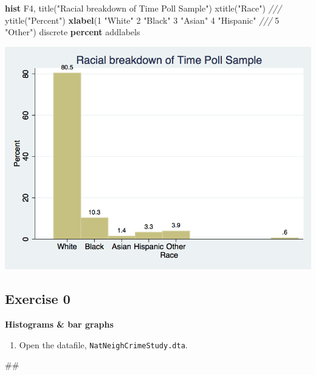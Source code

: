 \documentclass[
]{book}
\newenvironment{Shaded}{\begin{snugshade}}{\end{snugshade}}
\newcommand{\BaseNTok}[1]{\textcolor[rgb]{0.00,0.00,0.81}{#1}}
\newcommand{\CommentTok}[1]{\textcolor[rgb]{0.56,0.35,0.01}{\textit{#1}}}
\newcommand{\KeywordTok}[1]{\textcolor[rgb]{0.13,0.29,0.53}{\textbf{#1}}}
\newcommand{\NormalTok}[1]{#1}
\newcommand{\StringTok}[1]{\textcolor[rgb]{0.31,0.60,0.02}{#1}}
\providecommand{\tightlist}{%
  \setlength{\itemsep}{0pt}\setlength{\parskip}{0pt}}
\begin{document}
\begin{Shaded}
\begin{Highlighting}[]
\KeywordTok{hist}\NormalTok{ F4, }\BaseNTok{title}\NormalTok{(}\StringTok{"Racial breakdown of Time Poll Sample"}\NormalTok{) }\BaseNTok{xtitle}\NormalTok{(}\StringTok{"Race"}\NormalTok{) }\CommentTok{///}
   \BaseNTok{ytitle}\NormalTok{(}\StringTok{"Percent"}\NormalTok{) }\KeywordTok{xlabel}\NormalTok{(1 }\StringTok{"White"}\NormalTok{ 2 }\StringTok{"Black"}\NormalTok{ 3 }\StringTok{"Asian"}\NormalTok{ 4 }\StringTok{"Hispanic"} \CommentTok{///}
\NormalTok{   5 }\StringTok{"Other"}\NormalTok{) discrete }\KeywordTok{percent} \BaseNTok{addlabels}
\end{Highlighting}
\end{Shaded}

\includegraphics{Stata/StataGraphics/images/bargraph.png}

\hypertarget{exercise-0-8}{%
\subsection{Exercise 0}\label{exercise-0-8}}

\textbf{Histograms \& bar graphs}

\begin{enumerate}
\def\labelenumi{\arabic{enumi}.}
\tightlist
\item
  Open the datafile, \texttt{NatNeighCrimeStudy.dta}.
\end{enumerate}

\begin{Shaded}
\begin{Highlighting}[]
\NormalTok{\#\#}
\end{Highlighting}
\end{Shaded}
\end{document}
